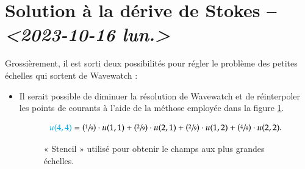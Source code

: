 \documentclass[10pt]{article}
\numberwithin{equation}{section}
\begin{document}
\section{Solution à la dérive de Stokes -- \textit{<2023-10-16 lun.>}}
\label{sec:org1b8958e}
Grossièrement, il est sorti deux possibilités pour régler le problème des petites échelles qui sortent de Wavewatch :
\begin{itemize}
\item Il serait possible de diminuer la résolution de Wavewatch et de réinterpoler les points de courants à l'aide de la méthose employée dans la figure \ref{orgc5e9c70}.

\begin{figure}[h!]
\begin{center}
\end{center}
\begin{equation}
   {\color{cyan}u(4,4)} = \qty(\sfrac{1}{9})\cdot u(1,1) + \qty(\sfrac{2}{9})\cdot u(2,1) + \qty(\sfrac{2}{9})\cdot u(1,2) + \qty(\sfrac{4}{9})\cdot u(2,2).
\end{equation}
\caption{\label{orgc5e9c70}« Stencil » utilisé pour obtenir le champs aux plus grandes échelles.}
\end{figure}
\end{itemize}





\end{document}
